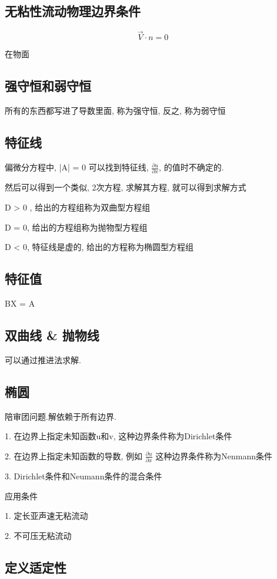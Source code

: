 \subsection{无粘性流动物理边界条件}
$$
	\vec{V} \cdot n = 0
$$

在物面

\subsection{强守恒和弱守恒}

所有的东西都写进了导数里面, 称为强守恒, 反之, 称为弱守恒

\subsection{特征线}
偏微分方程中, |A| = 0 可以找到特征线, $\frac{\partial u}{\partial x}$, 的值时不确定的.

然后可以得到一个类似, 2次方程, 求解其方程, 就可以得到求解方式

D > 0 , 给出的方程组称为双曲型方程组

D = 0, 给出的方程组称为抛物型方程组

D < 0, 特征线是虚的, 给出的方程称为椭圆型方程组

\subsection{特征值}
BX = A

\subsection{双曲线 \& 抛物线}

可以通过推进法求解.

\subsection{椭圆}

陪审团问题.解依赖于所有边界.

1. 在边界上指定未知函数u和v, 这种边界条件称为Dirichlet条件

2. 在边界上指定未知函数的导数, 例如 $\frac{\partial u}{\partial x}$ 这种边界条件称为Nenmann条件

3. Dirichlet条件和Neumann条件的混合条件

应用条件

1. 定长亚声速无粘流动

2. 不可压无粘流动

\subsection{定义适定性}

